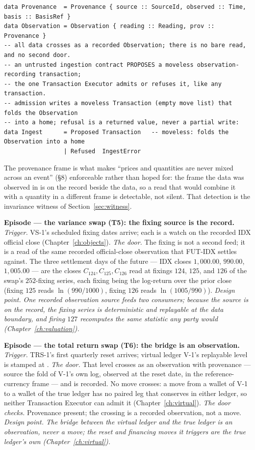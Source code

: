 \begin{lstlisting}
data Provenance  = Provenance { source :: SourceId, observed :: Time, basis :: BasisRef }
data Observation = Observation { reading :: Reading, prov :: Provenance }
-- all data crosses as a recorded Observation; there is no bare read, and no second door.
-- an untrusted ingestion contract PROPOSES a moveless observation-recording transaction;
-- the one Transaction Executor admits or refuses it, like any transaction.
-- admission writes a moveless Transaction (empty move list) that folds the Observation
-- into a home; refusal is a returned value, never a partial write:
data Ingest      = Proposed Transaction   -- moveless: folds the Observation into a home
                 | Refused  IngestError
\end{lstlisting}

The provenance frame is what makes ``prices and quantities are never mixed across an
event'' (\S 8) enforceable rather than hoped for: the frame the data was observed in is on
the record beside the data, so a read that would combine it with a quantity in a
different frame is detectable, not silent. That detection is the invariance witness of
Section~\ref{sec:witness}.

\medskip\noindent\textbf{Episode --- the variance swap (T5): the fixing source is the
record.}
\emph{Trigger.} VS-1's scheduled fixing dates arrive; each is a watch on the recorded IDX
official close (Chapter~\ref{ch:objects}). \emph{The door.} The fixing is not a second
feed; it is a read of the same recorded official-close observation that FUT-IDX settles
against. The three settlement days of the future --- IDX closes $1{,}000.00$, $990.00$,
$1{,}005.00$ --- are the closes $C_{124}, C_{125}, C_{126}$ read at fixings $124$,
$125$, and $126$ of the swap's $252$-fixing series, each fixing being the log-return
over the prior close (fixing $125$ reads $\ln(990/1000)$, fixing $126$ reads
$\ln(1005/990)$).
\emph{Design point.} \emph{One recorded observation source feeds two consumers; because
the source is on the record, the fixing series is deterministic and replayable at the data
boundary, and firing $127$ recomputes the same statistic any party would
(Chapter~\ref{ch:valuation}).}

\medskip\noindent\textbf{Episode --- the total return swap (T6): the bridge is an
observation.}
\emph{Trigger.} TRS-1's first quarterly reset arrives; virtual ledger V-1's replayable
level is stamped at . \emph{The door.} That level crosses as an
observation with provenance --- source the fold of V-1's own log, observed at the reset
date, in the reference-currency frame --- and is recorded. No move crosses: a move from a
wallet of V-1 to a wallet of the true ledger has no paired leg that conserves in either
ledger, so neither Transaction Executor can admit it (Chapter~\ref{ch:virtual}). \emph{The
door checks.} Provenance present; the crossing is a recorded observation, not a move.
\emph{Design point.} \emph{The bridge between the virtual ledger and the true ledger is an
observation, never a move; the reset and financing moves it triggers are the true ledger's
own (Chapter~\ref{ch:virtual}).}

